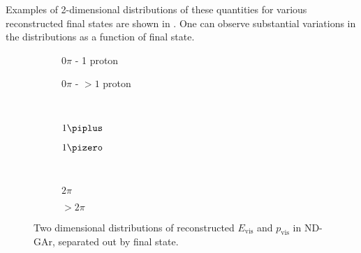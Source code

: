 Examples of 2-dimensional distributions of these quantities for various reconstructed final states are shown in .
One can observe substantial variations in the distributions as a function of final state.

\begin{figure}[t]
	\begin{subfigure}[t]{.5\linewidth}
		\begin{adjustbox}{max totalsize=\linewidth, center}
			
		\end{adjustbox}
		\caption{$0\pi$ - 1 proton}
	\end{subfigure}
	\hfill
	\begin{subfigure}[t]{.5\linewidth}
		\begin{adjustbox}{max totalsize=\linewidth, center}
			
		\end{adjustbox}
		\caption{$0\pi$ - $>1$ proton}
	\end{subfigure} \\
	\begin{subfigure}[t]{.5\linewidth}
		\begin{adjustbox}{max totalsize=\linewidth, center}
			
		\end{adjustbox}
		\caption{$1\piplus$}
	\end{subfigure}
	\hfill
	\begin{subfigure}[t]{.5\linewidth}
		\begin{adjustbox}{max totalsize=\linewidth, center}
			
		\end{adjustbox}
		\caption{$1\pizero$}
	\end{subfigure} \\
	\begin{subfigure}[t]{.5\linewidth}
		\begin{adjustbox}{max totalsize=\linewidth, center}
			
		\end{adjustbox}
		\caption{$2\pi$}
	\end{subfigure}
	\hfill
	\begin{subfigure}[t]{.5\linewidth}
		\begin{adjustbox}{max totalsize=\linewidth, center}
			
		\end{adjustbox}
		\caption{$>2\pi$}
	\end{subfigure}
	\caption[Two dimensional distributions of $E_{\text{vis}}$ and $p_{\text{vis}}$ in ND-GAr]{Two dimensional distributions of reconstructed $E_{\text{vis}}$ and $p_{\text{vis}}$ in ND-GAr, separated out by final state.}
	\label{fig:q0q3Genie}
\end{figure}


